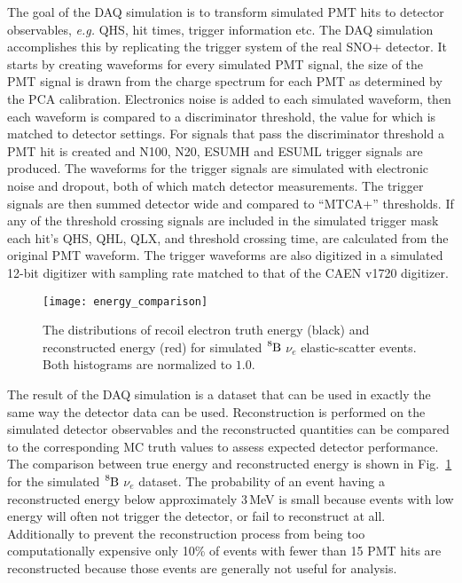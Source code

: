 The goal of the DAQ simulation is to transform simulated PMT hits to detector observables,
\textit{e.g.} QHS, hit times, trigger information etc.
The DAQ simulation accomplishes this by replicating the trigger system of the real SNO+ detector.
It starts by creating waveforms for every simulated PMT signal, the size
of the PMT signal is drawn from the charge spectrum for each PMT as determined
by the PCA calibration.
Electronics noise is added to each simulated waveform, then each waveform is compared to a discriminator
threshold, the value for which is matched to detector settings.
For signals that pass the discriminator threshold a PMT hit is created
and N100, N20, ESUMH and ESUML trigger signals are produced.
The waveforms for the trigger signals are simulated with electronic noise and dropout, both
of which match detector measurements.
The trigger signals are then summed detector wide and compared to ``MTCA+'' thresholds.
If any of the threshold crossing signals are included in the simulated trigger mask
each hit's  QHS, QHL, QLX, and threshold crossing time, are calculated from the original PMT waveform.
The trigger waveforms are also digitized in a simulated 12-bit digitizer with sampling rate matched
to that of the CAEN v1720 digitizer.

\begin{figure}[htbp]
  \centering
  \texttt{[image: energy\_comparison]}
  \caption[Reconstructed Energy Vs True Energy]{ The distributions of recoil
  electron truth energy (black) and reconstructed energy (red) for simulated
  $\ce{^{8}B}$ $\nu_{e}$ elastic-scatter events. Both histograms are normalized to $1.0$.} %
  \label{fig:energy_comparison}
\end{figure}

The result of the DAQ simulation is a dataset that can be used in exactly the same way the
detector data can be used.
Reconstruction is performed on the simulated detector observables 
 and the reconstructed quantities can be compared
to the corresponding MC truth values to assess expected detector performance.
The comparison between true energy and reconstructed energy is shown in
Fig.~\ref{fig:energy_comparison} for the simulated $\ce{^{8}B}$ $\nu_{e}$
dataset.
The probability of an event having a reconstructed energy below approximately 3\,MeV
is small because events with low energy will often not trigger the detector, or
fail to reconstruct at all.
Additionally to prevent the reconstruction process from being too computationally expensive
only 10\% of events with fewer than 15 PMT hits are reconstructed because
those events are generally not useful for analysis.


